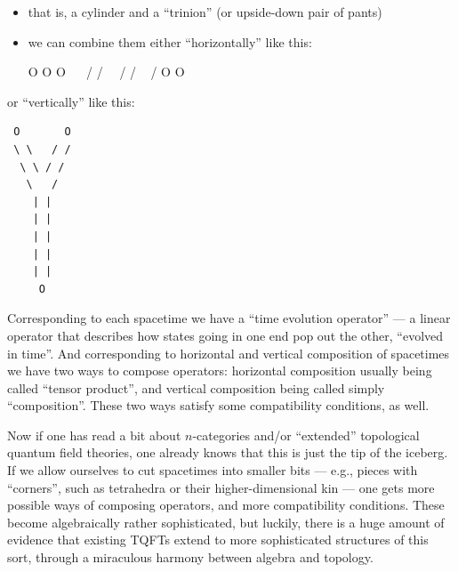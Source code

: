 \documentclass{article}
\begin{document}
\begin{itemize}
\item
  that is, a cylinder and a ``trinion'' (or upside-down pair of pants)
\item
  we can combine them either ``horizontally'' like this:

  O O O ~~ / / \textbar{} \textbar{} ~~/ / \textbar{} \textbar{} ~ /
  \textbar{} \textbar{} \textbar{} \textbar{} \textbar{} \textbar{} O O
\end{itemize}

or ``vertically'' like this:

\begin{verbatim}
 O       O
 \ \   / /
  \ \ / /
   \   /
    | |
    | |
    | |
    | |
    | |
     O
\end{verbatim}

Corresponding to each spacetime we have a ``time evolution operator''
--- a linear operator that describes how states going in one end pop out
the other, ``evolved in time''. And corresponding to horizontal and
vertical composition of spacetimes we have two ways to compose
operators: horizontal composition usually being called ``tensor
product'', and vertical composition being called simply ``composition''.
These two ways satisfy some compatibility conditions, as well.

Now if one has read a bit about \(n\)-categories and/or ``extended''
topological quantum field theories, one already knows that this is just
the tip of the iceberg. If we allow ourselves to cut spacetimes into
smaller bits --- e.g., pieces with ``corners'', such as tetrahedra or
their higher-dimensional kin --- one gets more possible ways of
composing operators, and more compatibility conditions. These become
algebraically rather sophisticated, but luckily, there is a huge amount
of evidence that existing TQFTs extend to more sophisticated structures
of this sort, through a miraculous harmony between algebra and topology.
\end{document}
